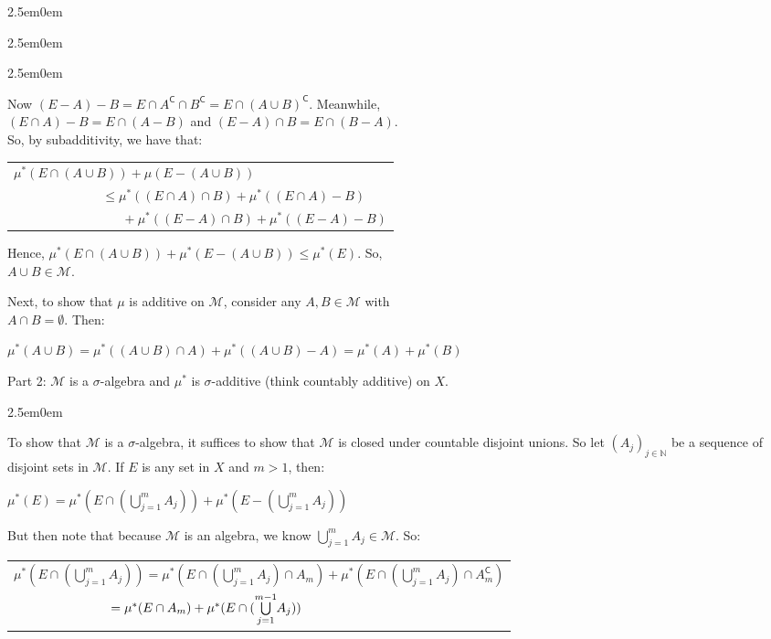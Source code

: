 \documentclass{book}
\newcommand{\hFour}{%
   \color{Cyan!80!black}
   \fontsize{12}{14}\selectfont%
}
\newenvironment{myIndent}{%
   \begin{adjustwidth}{2.5em}{0em}%
}{%
   \end{adjustwidth}%
}
\newcommand{\comp}{\mathsf{C}}
\newcommand{\retTwo}{\hfill\bigbreak}
\begin{document}
\begin{myIndent}
\begin{myIndent}
\begin{myIndent}
\begin{itemize}
            Now $(E - A) - B = E \cap A^\comp \cap B^\comp = E \cap (A \cup B)^\comp$. Meanwhile,\\ $(E \cap A) - B = E \cap (A - B)$ and $(E - A) \cap B = E \cap (B - A)$.\\ So, by subadditivity, we have that:

            {\centering\begin{tabular}{l}
               $\mu^*(E \cap (A \cup B)) + \mu(E - (A \cup B))$\\
               $\phantom{aaaaaaaaaaaaa} \leq \mu^*((E \cap A) \cap B) + \mu^*((E \cap A) - B)$\\ $\phantom{aaaaaaaaaaaaaaaa} + \mu^*((E - A) \cap B) + \mu^*((E - A) - B)$
            \end{tabular} \retTwo\par}

            Hence, $\mu^*(E \cap (A \cup B)) + \mu^*(E - (A \cup B)) \leq \mu^*(E)$. So,\\ $A \cup B \in \mathcal{M}$.\retTwo
         \end{itemize}

         Next, to show that $\mu$ is additive on $\mathcal{M}$, consider any $A, B \in \mathcal{M}$ with\\ $A \cap B = \emptyset$. Then:

         {\centering\fontsize{11}{13}\selectfont $\mu^*(A \cup B) = \mu^*((A \cup B) \cap A) + \mu^*((A \cup B) - A) = \mu^*(A) + \mu^*(B) $ \retTwo\par}
      \end{myIndent}

      Part 2: $\mathcal{M}$ is a $\sigma$-algebra and $\mu^*$ is $\sigma$-additive (think countably additive) on $X$.

      \begin{myIndent}\hFour
         To show that $\mathcal{M}$ is a $\sigma$-algebra, it suffices to show that $\mathcal{M}$ is closed under countable disjoint unions. So let $(A_j)_{j \in \mathbb{N}}$ be a sequence of disjoint sets in $\mathcal{M}$. If $E$ is any set in $X$ and $m > 1$, then:

         {\centering $\mu^*(E) = \mu^*(E \cap (\bigcup\limits_{j=1}^mA_j)) + \mu^*(E - (\bigcup\limits_{j=1}^mA_j))$  \retTwo\par}

         But then note that because $\mathcal{M}$ is an algebra, we know $\bigcup\limits_{j=1}^mA_j \in \mathcal{M}$. So:
         
         {\centering\fontsize{11.5}{13.5}\selectfont 
         \begin{tabular}{l}
            $\mu^*(E \cap (\bigcup\limits_{j=1}^mA_j)) = \mu^*(E \cap (\bigcup\limits_{j=1}^mA_j) \cap A_m) + \mu^*(E \cap (\bigcup\limits_{j=1}^mA_j) \cap A_m^\comp)$ \\ [-2pt]
            $\phantom{\mu^*(E \cap (\bigcup\limits_{j=1}^mA_j))} = \mu^*(E \cap A_m) + \mu^*(E \cap (\bigcup\limits_{j = 1}^{m-1}\hspace{-0.2em} A_j))$
         \end{tabular} \retTwo\par}


\end{myIndent}
\end{myIndent}
\end{myIndent}
\end{document}
